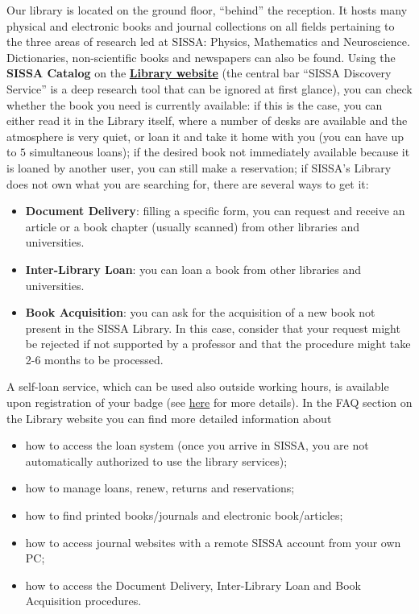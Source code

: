 \documentclass{sissavademecum}
\begin{document}
Our library is located on the ground floor, ``behind'' the reception. It hosts many physical and electronic books and journal collections on all fields pertaining to the three areas of research led at SISSA: Physics, Mathematics and Neuroscience. Dictionaries, non-scientific books and newspapers can also be found. Using the \textbf{SISSA Catalog} on the  \href{http://library.sissa.it}{\textbf{Library website}} (the central bar ``SISSA Discovery Service'' is a deep research tool that can be ignored at first glance), you can check whether the book you need is currently available: if this is the case, you can either read it in the Library itself, where a number of desks are available and the atmosphere is very quiet, or loan it and take it home with you (you can have up to $5$ simultaneous loans); if the desired book not immediately available because it is loaned by another user, you can still make a reservation; if SISSA's Library does not own what you are searching for, there are several ways to get it:
\begin{itemize}
    \item \textbf{Document Delivery}: filling a specific form, you can request and receive an article or a book chapter (usually scanned) from other libraries and universities.
    \item \textbf{Inter-Library Loan}: you can loan a book from other libraries and universities.
    \item \textbf{Book Acquisition}: you can ask for the acquisition of a new book not present in the SISSA Library. In this case, consider that your request might be rejected if not supported by a professor and that the procedure might take 2-6 months to be processed. 
\end{itemize}

A self-loan service, which can be used also outside working hours, is available upon registration of your badge (see \hyperlink{Badge}{here} for more details). In the FAQ section on the Library website you can find more detailed information about
\begin{itemize}
    \item how to access the loan system (once you arrive in SISSA, you are not automatically authorized to use the library services);
    \item how to manage loans, renew, returns and reservations;
    \item how to find printed books/journals and electronic book/articles;
    \item how to access journal websites with a remote SISSA account from your own PC;
    \item how to access the Document Delivery, Inter-Library Loan and Book Acquisition procedures.
\end{itemize}
\end{document}
